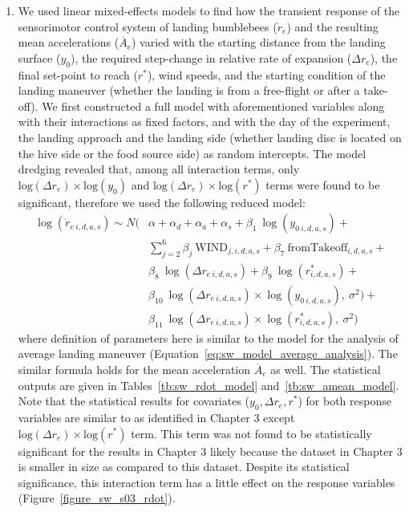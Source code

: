\begin{enumerate}
	\item We used linear mixed-effects models to find how the transient response of the sensorimotor control system of landing bumblebees ($\dot{r}_e$) and the resulting mean accelerations ($\overline{A}_e$) varied with the starting distance from the landing surface ($y_0$), the required step-change in relative rate of expansion ($\Delta r_e$), the final set-point to reach ($r^*$), wind speeds, and the starting condition of the landing maneuver (whether the landing is from a free-flight or after a take-off). We first constructed a full model with aforementioned variables along with their interactions as fixed factors, and with the day of the experiment, the landing approach and the landing side (whether landing disc is located on the hive side or the food source side) as random intercepts. The model dredging revealed that, among all interaction terms, only $\text{log}(\Delta r_e)\times \text{log}(y_0)$ and $\text{log}(\Delta r_e) \times \text{log}(r^*)$ terms were found to be significant, therefore we used the following reduced model:
	\begin{equation}
		\label{eq:sw_rdot_amean_model}
		\begin{array}{lll}
			\!\!\!\!\!\! \log(\dot{r}_{e~i,d,a,s}) \sim N( \!\!\!\!\!
			& \alpha + \alpha_d + \alpha_a + \alpha_s + \beta_1~\log(y_{0~i,d,a,s}) + \\
			& \sum_{j=2}^{6} \beta_j~\textrm{WIND}_{j,i,d,a,s} + \beta_7~\textrm{fromTakeoff}_{i,d,a,s} + \\ 
			& \beta_8~\log(\Delta r_{e~i,d,a,s}) + \beta_9~\log(r^*_{i,d,a,s}) +\\
			& \beta_{10}~\log(\Delta r_{e~i,d,a,s}) \times \log(y_{0~i,d,a,s}),~\sigma^2) + \\
			& \beta_{11}~\log(\Delta r_{e~i,d,a,s}) \times \log(r^*_{i,d,a,s}),~\sigma^2) 
		\end{array}                                          
	\end{equation}
	where definition of parameters here is similar to the model for the analysis of average landing maneuver (Equation~\ref{eq:sw_model_average_analysis}). The similar formula holds for the mean acceleration $\overline{A}_e$ as well. The statistical outputs are given in Tables~\ref{tb:sw_rdot_model} and~\ref{tb:sw_amean_model}. Note that the statistical results for covariates ($y_0, \Delta r_e, r^*$) for both response variables are similar to as identified in Chapter 3 except $\text{log}(\Delta r_e) \times \text{log}(r^*)$ term. This term was not found to be statistically significant for the results in Chapter 3 likely because the dataset in Chapter 3 is smaller in size as compared to this dataset. Despite its statistical significance, this interaction term has a little effect on the response variables (Figure~\ref{figure_sw_s03_rdot}).
	

\end{enumerate}
